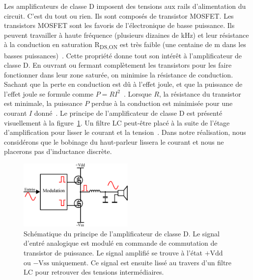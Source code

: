 \documentclass[10pt, oneside, a4paper]{article}
\begin{document}
Les amplificateurs de classe D imposent des tensions aux rails d'alimentation du circuit.
C'est du tout ou rien.
Ils sont composés de transistor MOSFET.
Les transistors MOSFET sont les favoris de l'électronique de basse puissance.
Ils peuvent travailler à haute fréquence (plusieurs dizaines de kHz) et leur résistance à la conduction en saturation \og{}R\textsubscript{DS,ON}\fg{} est très faible (une centaine de m\Omega{} dans les basses puissances)~\cite{irf2017mosfet}.
Cette propriété donne tout son intérêt à l'amplificateur de classe D.
En ouvrant ou fermant complètement les transistors pour les faire fonctionner dans leur zone saturée, on minimise la résistance de conduction.
Sachant que la perte en conduction est dû à l'effet joule, et que la puissance de l'effet joule se formule comme $P=RI^2$~\cite{griffiths1999introduction}.
Lorsque $R$, la résistance du transistor est minimale, la puissance $P$ perdue à la conduction est minimisée pour une courant $I$ donné~\cite{sente2017elec}.
Le principe de l'amplificateur de classe D est présenté visuellement à la figure~\ref{fig:classeD}.
Un filtre LC peut-être placé à la suite de l'étage d'amplification pour lisser le courant et la tension~\cite{wildi2005electrotech}.
Dans notre réalisation, nous considérons que le bobinage du haut-parleur lissera le courant et nous ne placerons pas d'inductance discrète.

\begin{figure}[htbp]
    \centering
    \includegraphics[width=0.5\textwidth]{eps/classe-d.eps}
    \caption{Schématique du principe de l'amplificateur de classe D.
             Le signal d'entré analogique est modulé en commande de commutation de
             transistor de puissance.
             Le signal amplifié se trouve à l'état $+\text{Vdd}$ ou $-\text{Vss}$
             uniquement.
             Ce signal est ensuite lissé au travers d'un filtre LC pour retrouver
             des tensions intermédiaires.}
    \label{fig:classeD}
\end{figure}
\newpage

\end{document}
